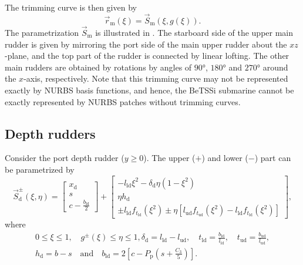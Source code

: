 The trimming curve is then given by
\begin{equation*}
	\vec{r}_{\mathrm{m}}(\xi) = \vec{S}_{\mathrm{m}}(\xi,g(\xi)).
\end{equation*}
The parametrization $\vec{S}_{\mathrm{m}}$ is illustrated in . The starboard side of the upper main rudder is given by mirroring the port side of the main upper rudder about the $xz$-plane, and the top part of the rudder is connected by linear lofting. The other main rudders are obtained by rotations by angles of $\ang{90}$, $\ang{180}$ and $\ang{270}$ around the $x$-axis, respectively. Note that this trimming curve may not be represented exactly by NURBS basis functions, and hence, the BeTSSi submarine cannot be exactly represented by NURBS patches without trimming curves.

\subsection{Depth rudders}
Consider the port depth rudder ($y\geq 0$). The upper ($+$) and lower ($-$) part can be parametrized by
\begin{equation}\label{Eq3:depthRudders}
	\vec{S}_{\mathrm{d}}^\pm(\xi,\eta) = \begin{bmatrix}
		x_{\mathrm{d}}\\
		s\\
		c-\frac{b_{\mathrm{ld}}}{2}
\end{bmatrix}	 + \begin{bmatrix}
	-l_{\mathrm{ld}} \xi^2-\delta_{\mathrm{d}}\eta\left(1-\xi^2\right)\\
	\eta h_{\mathrm{d}}\\
	\pm l_{\mathrm{ld}}f_{t_{\mathrm{ld}}}(\xi^2) \pm \eta\left[l_{\mathrm{ud}}f_{t_{\mathrm{ud}}}(\xi^2)-l_{\mathrm{ld}}f_{t_{\mathrm{ld}}}(\xi^2)\right]
	\end{bmatrix},
\end{equation}
where
\begin{equation*}
\begin{aligned}
	0\leq \xi\leq 1,\quad g^\pm(\xi)\leq \eta \leq 1,
	\delta_{\mathrm{d}}=l_{\mathrm{ld}}-l_{\mathrm{ud}},\quad t_{\mathrm{ld}}=\frac{b_{\mathrm{ld}}}{l_{\mathrm{ld}}},\quad t_{\mathrm{ud}}=\frac{b_{\mathrm{ud}}}{l_{\mathrm{ud}}},\\
	h_{\mathrm{d}}=b-s\quad\text{and}\quad b_{\mathrm{ld}}=2\left[c-P_{\mathrm{p}}\left(s+\frac{C_3}{5}\right)\right].
\end{aligned}
\end{equation*}
